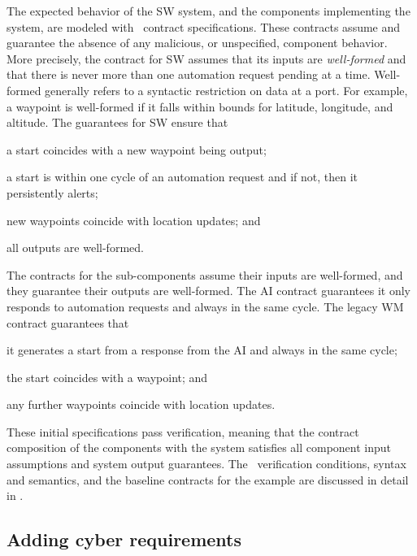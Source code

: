 
The expected behavior of the SW system, and the components
implementing the system, are modeled with \agr\ contract
specifications.  
These contracts assume and guarantee the absence
of any malicious, or unspecified, component behavior.  More precisely,
the contract for SW assumes that its inputs are \emph{well-formed} and that
there is never more than one automation request pending at a time.
Well-formed generally refers to a syntactic restriction on
data at a port. For example, a waypoint is well-formed if it falls
within bounds for latitude, longitude, and altitude.  The guarantees
for SW ensure that
\begin{compactitem}
\item a start coincides with a new waypoint being output;
\item a start is within one cycle of an automation request and if not, then it persistently alerts;
\item new waypoints coincide with location updates; and
\item all outputs are well-formed.
\end{compactitem}

The contracts for the sub-components assume their inputs are
well-formed, and they guarantee their outputs are well-formed.  The AI
contract guarantees it only responds to automation requests and always
in the same cycle.  The legacy WM contract guarantees that
\begin{compactitem}
  \item it generates a start from a response from the AI and always in the same cycle;
  \item the start coincides with a waypoint; and
  \item any further waypoints coincide with location updates.
\end{compactitem}

These initial specifications pass verification, meaning that the
contract composition of the components with the system satisfies all
component input assumptions and system output guarantees.
The \agr\ verification conditions, syntax and semantics, and the baseline contracts for the example are discussed in detail in .

\subsection{Adding cyber requirements}

